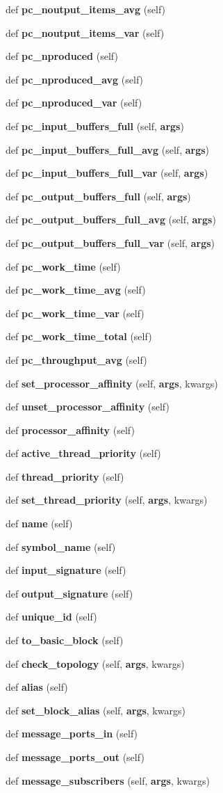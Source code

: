 \begin{DoxyCompactItemize}
def {\bf pc\+\_\+noutput\+\_\+items\+\_\+avg} (self)
\item 
def {\bf pc\+\_\+noutput\+\_\+items\+\_\+var} (self)
\item 
def {\bf pc\+\_\+nproduced} (self)
\item 
def {\bf pc\+\_\+nproduced\+\_\+avg} (self)
\item 
def {\bf pc\+\_\+nproduced\+\_\+var} (self)
\item 
def {\bf pc\+\_\+input\+\_\+buffers\+\_\+full} (self, {\bf args})
\item 
def {\bf pc\+\_\+input\+\_\+buffers\+\_\+full\+\_\+avg} (self, {\bf args})
\item 
def {\bf pc\+\_\+input\+\_\+buffers\+\_\+full\+\_\+var} (self, {\bf args})
\item 
def {\bf pc\+\_\+output\+\_\+buffers\+\_\+full} (self, {\bf args})
\item 
def {\bf pc\+\_\+output\+\_\+buffers\+\_\+full\+\_\+avg} (self, {\bf args})
\item 
def {\bf pc\+\_\+output\+\_\+buffers\+\_\+full\+\_\+var} (self, {\bf args})
\item 
def {\bf pc\+\_\+work\+\_\+time} (self)
\item 
def {\bf pc\+\_\+work\+\_\+time\+\_\+avg} (self)
\item 
def {\bf pc\+\_\+work\+\_\+time\+\_\+var} (self)
\item 
def {\bf pc\+\_\+work\+\_\+time\+\_\+total} (self)
\item 
def {\bf pc\+\_\+throughput\+\_\+avg} (self)
\item 
def {\bf set\+\_\+processor\+\_\+affinity} (self, {\bf args}, kwargs)
\item 
def {\bf unset\+\_\+processor\+\_\+affinity} (self)
\item 
def {\bf processor\+\_\+affinity} (self)
\item 
def {\bf active\+\_\+thread\+\_\+priority} (self)
\item 
def {\bf thread\+\_\+priority} (self)
\item 
def {\bf set\+\_\+thread\+\_\+priority} (self, {\bf args}, kwargs)
\item 
def {\bf name} (self)
\item 
def {\bf symbol\+\_\+name} (self)
\item 
def {\bf input\+\_\+signature} (self)
\item 
def {\bf output\+\_\+signature} (self)
\item 
def {\bf unique\+\_\+id} (self)
\item 
def {\bf to\+\_\+basic\+\_\+block} (self)
\item 
def {\bf check\+\_\+topology} (self, {\bf args}, kwargs)
\item 
def {\bf alias} (self)
\item 
def {\bf set\+\_\+block\+\_\+alias} (self, {\bf args}, kwargs)
\item 
def {\bf message\+\_\+ports\+\_\+in} (self)
\item 
def {\bf message\+\_\+ports\+\_\+out} (self)
\item 
def {\bf message\+\_\+subscribers} (self, {\bf args}, kwargs)
\end{DoxyCompactItemize}
